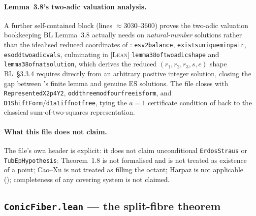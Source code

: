 \documentclass[11pt]{article}
\theoremstyle{plain}
\theoremstyle{definition}
\theoremstyle{remark}
\newcommand{\LEAN}{\textcolor{proved}{\textsc{[Lean]}}}
\newcommand{\file}[1]{\texttt{#1}}
\newcommand{\lean}[1]{\texttt{#1}}
\renewcommand{\_}{\textunderscore\allowbreak}
\begin{document}
\paragraph{Lemma~3.8's two-adic valuation analysis.}
A further self-contained block (lines $\approx3030$--$3600$) proves the two-adic valuation
bookkeeping BL Lemma~3.8 actually needs on \emph{natural-number} solutions rather than the
idealised reduced coordinates of : \lean{es\_v2\_balance},
\lean{exists\_unique\_min\_pair}, \lean{es\_odd\_two\_adic\_vals}, culminating in
\LEAN{} \lean{lemma38\_of\_two\_adic\_shape} and \lean{lemma38\_of\_nat\_solution}, which
derives the reduced $(r_1,r_2,r_3,s,e)$ shape BL~\S3.3.4 requires directly from an arbitrary
positive integer solution, closing the gap between 's finite
lemma and genuine ES solutions. The file closes with \lean{RepresentedX2p4Y2},
\lean{odd\_three\_mod\_four\_free\_is\_form}, and \lean{D1ShiftForm}/\lean{d1\_a1\_iff\_not\_free},
tying the $a=1$ certificate condition of  back to the classical
sum-of-two-squares representation.

\paragraph{What this file does not claim.}
The file's own header is explicit: it does not claim unconditional \lean{ErdosStraus} or
\lean{TubEpHypothesis}; Theorem~1.8 is not formalised and is not treated as existence of a
point; Cao--Xu is not treated as filling the octant; Harpaz is not applicable ();
completeness of any covering system is not claimed.


\subsection{\file{ConicFiber.lean} — the split-fibre theorem}
\label{subsec:conicfiber}
\end{document}
